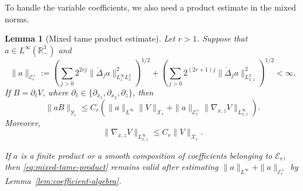 \documentclass[12pt]{amsart}
\newtheorem{lemma}[theorem]{Lemma}
\theoremstyle{remark}
\theoremstyle{definition}
\numberwithin{equation}{section}
\newcommand{\R}{\mathbb{R}}
\begin{document}
To handle the variable coefficients, we also need a product estimate in
the mixed norms.

\begin{lemma}[Mixed tame product estimate]
\label{lem:mixed-tame-product}
Let \(r>1\).
Suppose that \(a\in L^\infty(\R^3_-)\) and
\[
 \|a\|_{\mathcal E_r^+} := \left( \sum_{j>0} 2^{2rj} \|\dot\Delta_ja\|_{L^\infty_zL^2_x}^2 \right)^{1/2} + \left( \sum_{j>0} 2^{(2r+1)j} \|\dot\Delta_ja\|_{L^2_{x,z}}^2 \right)^{1/2} <\infty.
\]
If \(B=\partial_\ell V\), where
\(\partial_\ell\in
\{\partial_{x_1},\partial_{x_2},\partial_z\}\), then
\begin{equation}
\label{eq:mixed-tame-product}
 \|aB\|_{\mathcal Y_r} \leq C_r \left( \|a\|_{L^\infty}\|V\|_{\mathcal X_r} + \|a\|_{\mathcal E_r^+} \|\nabla_{x,z}V\|_{L^\infty_{x,z}} \right).
\end{equation}
Moreover,
\begin{equation}
\label{eq:X-to-Linfty}
 \|\nabla_{x,z}V\|_{L^\infty_{x,z}} \leq C_r\|V\|_{\mathcal X_r}.
\end{equation}

If \(a\) is a finite product or a smooth composition of coefficients belonging to \(\mathcal E_r\), then \eqref{eq:mixed-tame-product} remains valid after estimating \(\|a\|_{L^\infty}+\|a\|_{\mathcal E_r^+}\) by Lemma~\ref{lem:coefficient-algebra}.
\end{lemma}
\end{document}
